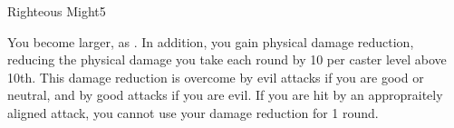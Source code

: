\begin{spellsection}{Righteous Might}{5}
\begin{spellheader}
\end{spellheader}
\begin{spellcontent}
    \begin{spelltargetinginfo}
    \end{spelltargetinginfo}
    \begin{spelleffects}
        \spellsuccess You become larger, as . In addition, you gain physical damage reduction, reducing the physical damage you take each round by 10  per caster level above 10th. This damage reduction is overcome by evil attacks if you are good or neutral, and by good attacks if you are evil. If you are hit by an appropraitely aligned attack, you cannot use your damage reduction for 1 round.
        \spelldur \durshort \dismissable
    \end{spelleffects}
\end{spellcontent}
\begin{spellfooter}
    \spellnotes \sizingspellnotes
\end{spellfooter}

\begin{comment}
\subsubsection{S}
\end{comment}
\end{spellsection}

